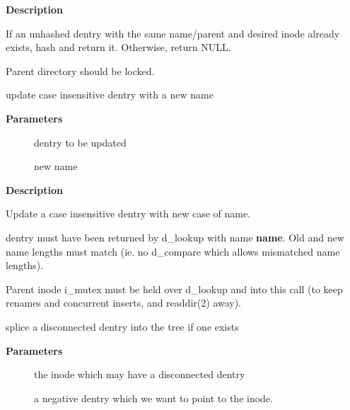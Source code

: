 \documentclass[a4paper,8pt,english]{sphinxmanual}
\begin{document}
\textbf{Description}

If an unhashed dentry with the same name/parent and desired
inode already exists, hash and return it.  Otherwise, return
NULL.

Parent directory should be locked.

\begin{fulllineitems}
\label{filesystems/index:c.dentry_update_name_case}
update case insensitive dentry with a new name

\end{fulllineitems}


\textbf{Parameters}
\begin{description}
\item[{}] \leavevmode
dentry to be updated

\item[{}] \leavevmode
new name

\end{description}

\textbf{Description}

Update a case insensitive dentry with new case of name.

dentry must have been returned by d\_lookup with name \textbf{name}. Old and new
name lengths must match (ie. no d\_compare which allows mismatched name
lengths).

Parent inode i\_mutex must be held over d\_lookup and into this call (to
keep renames and concurrent inserts, and readdir(2) away).

\begin{fulllineitems}
\label{filesystems/index:c.d_splice_alias}
splice a disconnected dentry into the tree if one exists

\end{fulllineitems}


\textbf{Parameters}
\begin{description}
\item[{}] \leavevmode
the inode which may have a disconnected dentry

\item[{}] \leavevmode
a negative dentry which we want to point to the inode.

\end{description}
\end{document}
